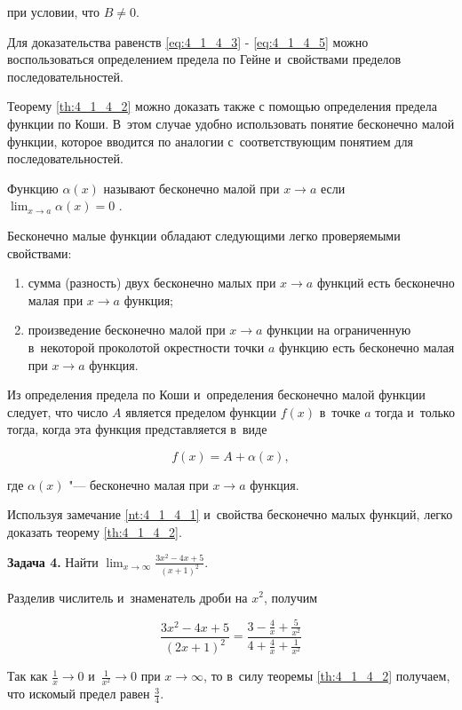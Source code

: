 \noindent
при условии, что $B \ne 0$.

Для доказательства равенств \eqref{eq:4_1_4_3} - \eqref{eq:4_1_4_5}
можно воспользоваться определением предела по Гейне
и~свойствами пределов последовательностей.

Теорему \ref{th:4_1_4_2} можно доказать также с помощью определения
предела функции по Коши. В~этом случае удобно использовать понятие бесконечно
малой функции, которое вводится по аналогии с~соответствующим понятием
для последовательностей.

Функцию $\alpha(x)$ называют бесконечно малой при $x \to a$ если
$\displaystyle \lim_{x \to a} \alpha(x) = 0$ .

Бесконечно малые функции обладают следующими легко проверяемыми свойствами:

\begin{enumerate}
\item сумма (разность) двух бесконечно малых при $x \to a$ функций есть
бесконечно малая при $x \to a$ функция;
\item произведение бесконечно малой при $x \to a$ функции на ограниченную
в~некоторой проколотой окрестности точки $a$ функцию есть бесконечно малая
при $x \to a$ функция.
\end{enumerate}

\begin{Note}\label{nt:4_1_4_1}
Из определения предела по Коши и~определения бесконечно малой функции следует,
что число $A$ является пределом функции $f(x)$ в~точке $a$ тогда и~только тогда,
когда эта функция представляется в~виде

\begin{equation*}
f(x) = A + \alpha(x),
\end{equation*}

\noindent
где $\alpha(x)$ "--- бесконечно малая при $x \to a$ функция.
\end{Note}

Используя замечание \ref{nt:4_1_4_1} и~свойства бесконечно малых функций,
легко доказать теорему \ref{th:4_1_4_2}.

\textbf{Задача 4.}\label{ex:4_1_4_4} Найти
$\displaystyle \lim_{x \to \infty} \frac{3x^{2} - 4x +5}{(x + 1)^{2}}$.

Разделив числитель и~знаменатель дроби на $x^{2}$, получим

\begin{equation*} 
\frac{3x^{2} - 4x + 5}{(2x + 1)^{2}} =
\displaystyle \frac{3 - \frac{4}{x} + \frac{5}{x^{2}}}{4 + \frac{4}{x} + \frac{1}{x^{2}}}
\end{equation*} 

\noindent
Так как $\displaystyle \frac{1}{x} \to 0$  и~$\displaystyle \frac{1}{x^{2}} \to 0$
при $x \to \infty$, то в~силу теоремы \ref{th:4_1_4_2} получаем,
что искомый предел равен $\displaystyle \frac{3}{4}$.

